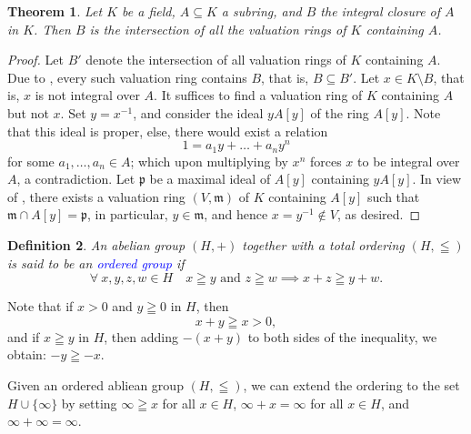 \documentclass[11pt]{article}
\theoremstyle{thmstyle}
\newtheorem{theorem}{Theorem}[section]
\theoremstyle{defstyle}
\newtheorem{definition}[theorem]{Definition}
\newcommand{\frakm}{\mathfrak{m}} %
\newcommand{\frakp}{\mathfrak{p}} %
\newcommand{\define}[1]{\textcolor{blue}{\textit{#1}}}
\begin{document}
\begin{theorem}
    Let $K$ be a field, $A\subseteq K$ a subring, and $B$ the integral closure of $A$ in $K$. Then $B$ is the intersection of all the valuation rings of $K$ containing $A$.
\end{theorem}
\begin{proof}
    Let $B'$ denote the intersection of all valuation rings of $K$ containing $A$. Due to , every such valuation ring contains $B$, that is, $B\subseteq B'$. Let $x\in K\setminus B$, that is, $x$ is not integral over $A$. It suffices to find a valuation ring of $K$ containing $A$ but not $x$. Set $y = x^{-1}$, and consider the ideal $yA[y]$ of the ring $A[y]$. Note that this ideal is proper, else, there would exist a relation 
    \begin{equation*}
        1 = a_1 y + \dots + a_n y^n
    \end{equation*}
    for some $a_1,\dots,a_n\in A$; which upon multiplying by $x^n$ forces $x$ to be integral over $A$, a contradiction. Let $\frakp$ be a maximal ideal of $A[y]$ containing $yA[y]$. In view of , there exists a valuation ring $(V,\frakm)$ of $K$ containing $A[y]$ such that $\frakm\cap A[y] = \frakp$, in particular, $y\in\frakm$, and hence $x = y^{-1}\notin V$, as desired.
\end{proof}

\begin{definition}
    An abelian group $(H, +)$ together with a total ordering $(H, \leqq)$ is said to be an \define{ordered group} if 
    \begin{equation*}
        \forall~x,y,z,w\in H\quad x\geqq y\text{ and }z\geqq w\implies x + z\geqq y + w.
    \end{equation*}
\end{definition}
Note that if $x > 0$ and $y\geqq 0$ in $H$, then 
\begin{equation*}
    x + y\geqq x > 0,
\end{equation*}
and if $x\geqq y$ in $H$, then adding $-(x + y)$ to both sides of the inequality, we obtain: $-y\geqq -x$.

Given an ordered abliean group $(H,\leqq)$, we can extend the ordering to the set $H\cup\{\infty\}$ by setting $\infty\geqq x$ for all $x\in H$, $\infty + x = \infty$ for all $x\in H$, and $\infty + \infty = \infty$.
\end{document}
